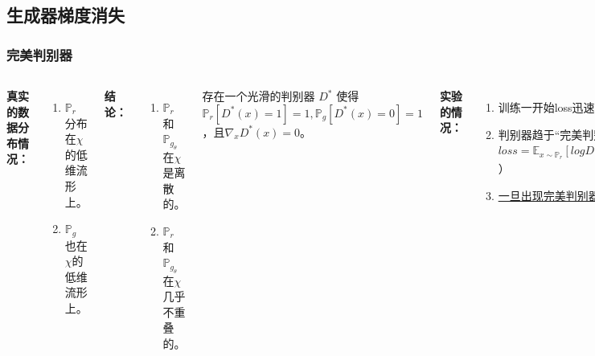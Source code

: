 \documentclass[xelatex]{beamer}
\begin{document}
\subsection{生成器梯度消失}
\begin{frame}
\frametitle{完美判别器}
\begin{columns}[t]
    \textbf{真实的数据分布情况：} \\
    \begin{enumerate}
      \item $\mathbb{P}_r$分布在$\chi$的低维流形上。
      \item $\mathbb{P}_g$也在$\chi$的低维流形上。
    \end{enumerate}
    \vspace{3mm}
    \textbf{结论：} \\
    \begin{enumerate}
      \item $\mathbb{P}_r$和$\mathbb{P}_{g_\theta}$在$\chi$是离散的。
      \item $\mathbb{P}_r$和$\mathbb{P}_{g_\theta}$在$\chi$几乎不重叠的。
    \end{enumerate}
    \begin{theorem}[完美判别器]
      存在一个光滑的判别器 $D^*$ 使得$\mathbb{P}_r[D^*(x) = 1] = 1,\mathbb{P}_g[D^*(x) = 0] = 1$，且$\nabla_xD^*(x) = 0$。
    \end{theorem}

    \textbf{实验的情况：} \\
      \begin{enumerate}
        \item 训练一开始loss迅速降为0。
        \vspace{2mm}
        \item 判别器趋于“完美判别器”，由$loss = \mathbb{E}_{x \sim \mathbb{P}_r}[logD(x)] + \mathbb{E}_{x \sim \mathbb{P}_g}[log(1-D(x))]$）
        \vspace{2mm}
        \item \uline{一旦出现完美判别器情况，就无法训练。}
      \end{enumerate}
  \end{columns}
  
\end{frame}
\end{document}
